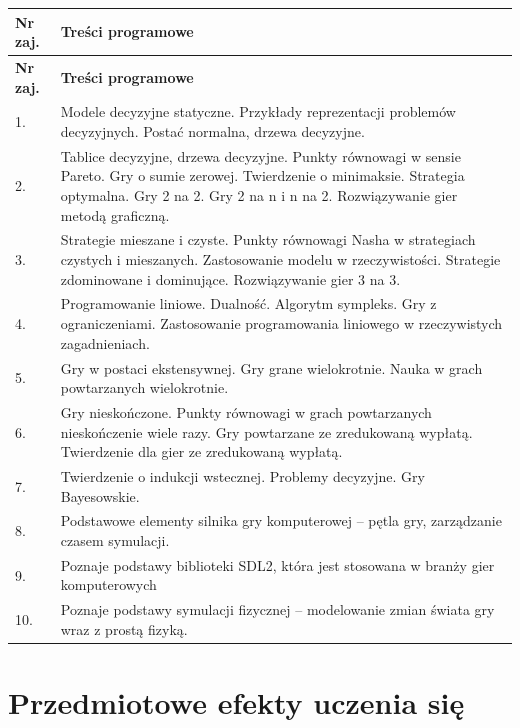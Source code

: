 \documentclass[12pt, a4paper]{article}
\newcommand{\thdrule}{\noalign{\global\setlength{\extrarowheight}{0pt}}}
\newcommand{\thdend}{\noalign{\global\setlength{\extrarowheight}{3pt}}}
\begin{document}
{\scriptsize
\begin{longtable}{m{1.5cm}m{14.5cm}}
\thdrule\toprule
\rowcolor{pjatkRed} {\color{white}\textbf{Nr zaj.}} & {\color{white}\textbf{Treści programowe}} \\
\midrule\thdend
\endfirsthead
\thdrule\toprule
\rowcolor{pjatkRed} {\color{white}\textbf{Nr zaj.}} & {\color{white}\textbf{Treści programowe}} \\
\midrule\thdend
\endhead
  \rowcolor{tableRowLight} 1. & Modele decyzyjne statyczne. Przykłady reprezentacji problemów decyzyjnych. Postać normalna,  drzewa decyzyjne. \\
  \rowcolor{tableRowAlt} 2. & Tablice decyzyjne, drzewa decyzyjne. Punkty równowagi w sensie Pareto. Gry o sumie zerowej.  Twierdzenie o minimaksie. Strategia optymalna. Gry 2 na 2. Gry 2 na n i n na 2. Rozwiązywanie gier metodą graficzną. \\
  \rowcolor{tableRowLight} 3. & Strategie mieszane i czyste. Punkty równowagi Nasha w strategiach czystych i mieszanych. Zastosowanie modelu w rzeczywistości. Strategie zdominowane i dominujące.   Rozwiązywanie gier 3 na 3. \\
  \rowcolor{tableRowAlt} 4. & Programowanie liniowe. Dualność. Algorytm sympleks. Gry z ograniczeniami.  Zastosowanie programowania liniowego w rzeczywistych zagadnieniach. \\
  \rowcolor{tableRowLight} 5. & Gry w postaci ekstensywnej. Gry grane wielokrotnie. Nauka w grach powtarzanych wielokrotnie. \\
  \rowcolor{tableRowAlt} 6. & Gry nieskończone. Punkty równowagi w grach powtarzanych nieskończenie wiele razy. Gry powtarzane ze zredukowaną wypłatą. Twierdzenie dla gier ze zredukowaną wypłatą. \\
  \rowcolor{tableRowLight} 7. & Twierdzenie o indukcji wstecznej. Problemy decyzyjne.  Gry Bayesowskie. \\
  \rowcolor{tableRowAlt} 8. & Podstawowe elementy silnika gry komputerowej – pętla gry, zarządzanie czasem symulacji. \\
  \rowcolor{tableRowLight} 9. & Poznaje podstawy biblioteki SDL2, która jest stosowana w branży gier komputerowych \\
  \rowcolor{tableRowAlt} 10. & Poznaje podstawy symulacji fizycznej – modelowanie zmian świata gry wraz z prostą fizyką. \\
\bottomrule
\end{longtable}}

\section{Przedmiotowe efekty uczenia się}
\end{document}
